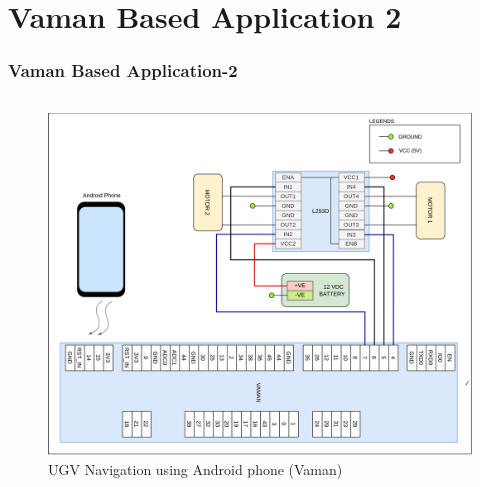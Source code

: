 \documentclass{beamer}
\begin{document}
\section{Vaman Based Application 2}
\begin{frame}
\frametitle{Vaman Based Application-2}
\begin{columns}
	\begin{figure}[h!]
  		\centering
  		\includegraphics[width=\linewidth]{./figs/Wiring_UGV_phone_vaman.png}
  		\caption{UGV Navigation using Android phone (Vaman)}
  		\label{Wiring_UGV_phone_vaman}
	\end{figure}
\end{columns}
\end{frame}
\end{document}
